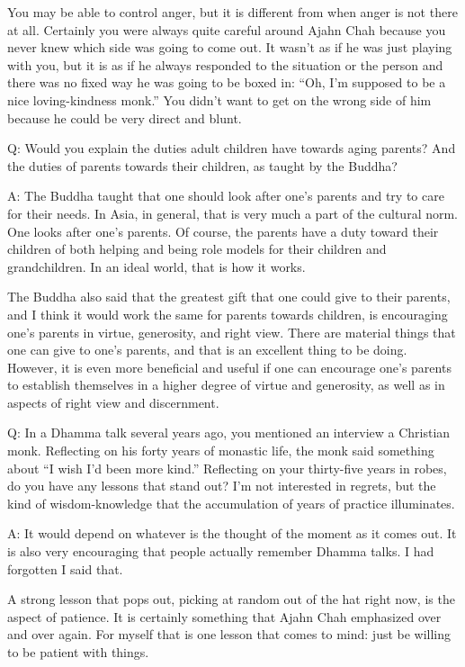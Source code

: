 You may be able to control anger, but it is different from when anger is
not there at all. Certainly you were always quite careful around Ajahn
Chah because you never knew which side was going to come out. It wasn’t
as if he was just playing with you, but it is as if he always responded
to the situation or the person and there was no fixed way he was going
to be boxed in: “Oh, I’m supposed to be a nice loving-kindness monk.”
You didn’t want to get on the wrong side of him because he could be very
direct and blunt.

\qaspace
Q: Would you explain the duties adult children have towards aging
parents? And the duties of parents towards their children, as taught by
the Buddha?

\qaspace
A: The Buddha taught that one should look after one’s parents and try to
care for their needs. In Asia, in general, that is very much a part of
the cultural norm. One looks after one’s parents. Of course, the parents
have a duty toward their children of both helping and being role models
for their children and grandchildren. In an ideal world, that is how it
works.

The Buddha also said that the greatest gift that one could give to their
parents, and I think it would work the same for parents towards
children, is encouraging one’s parents in virtue, generosity, and right
view. There are material things that one can give to one’s parents, and
that is an excellent thing to be doing. However, it is even more
beneficial and useful if one can encourage one’s parents to establish
themselves in a higher degree of virtue and generosity, as well as in
aspects of right view and discernment.

\qaspace
Q: In a Dhamma talk several years ago, you mentioned an interview a
Christian monk. Reflecting on his forty years of monastic life, the monk
said something about “I wish I’d been more kind.” Reflecting on your
thirty-five years in robes, do you have any lessons that stand out? I’m
not interested in regrets, but the kind of wisdom-knowledge that the
accumulation of years of practice illuminates.

\qaspace
A: It would depend on whatever is the thought of the moment as it comes
out. It is also very encouraging that people actually remember Dhamma
talks. I had forgotten I said that.

A strong lesson that pops out, picking at random out of the hat right
now, is the aspect of patience. It is certainly something that Ajahn
Chah emphasized over and over again. For myself that is one lesson that
comes to mind: just be willing to be patient with things.

